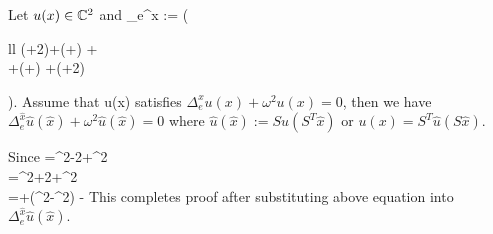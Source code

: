 \documentclass[12pt]{iopart}
\begin{document}
\begin{thm}
	Let $u(x)\in {\mathbb{C}}^2$ and
	\ben
		\Delta_e^x := \left(\begin{array}{ll}
		(\lambda +2\mu)+(\lambda +\mu)  +\mu {}\\
		\mu {}+(\lambda +\mu) +(\lambda +2\mu)
		\end{array}\right).
	\een
Assume that u(x) satisfies $\Delta_e^x u(x)+\omega^2 u(x)=0$, then  we have $\Delta_e^{\hat x} \hat u(\hat x)+\omega^2 \hat u(\hat x)=0$ where $\hat u(\hat x):= S u(S^T\hat x)$ or $u(x)=S^T\hat u(S\hat x)$.
\end{thm}
\debproof
Since
\ben
{}=\cos^2\phi {}-2\cos\phi\sin\phi {}+\sin^2\phi {} \\
=\sin^2\phi {}+2\cos\phi\sin\phi {}+\cos^2\phi {} \\
=\cos\phi\sin\phi{}+(\cos^2\phi-\sin^2\phi) -\cos\phi\sin\phi{}
\een
This completes proof after substituting above equation into $\Delta_e^{\hat x} \hat u(\hat x)$.
\finproof
\end{document}
